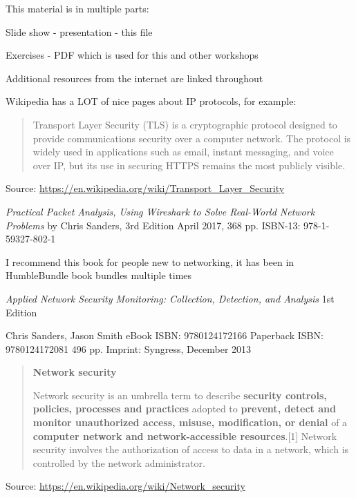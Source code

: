 \documentclass[Screen16to9,17pt]{foils}
\begin{document}

\begin{list2}
\item This material is in multiple parts:

\item Slide show - presentation - this file
\item Exercises - PDF which is used for this and other workshops
\item Additional resources from the internet are linked throughout
\item Wikipedia has a LOT of nice pages about IP protocols, for example:
\end{list2}

\begin{quote}\small
Transport Layer Security (TLS) is a cryptographic protocol designed to provide communications security over a computer network. The protocol is widely used in applications such as email, instant messaging, and voice over IP, but its use in securing HTTPS remains the most publicly visible.
\end{quote}
Source: \url{https://en.wikipedia.org/wiki/Transport_Layer_Security}




\emph{Practical Packet Analysis,
Using Wireshark to Solve Real-World Network Problems}
by Chris Sanders, 3rd Edition
April 2017, 368 pp.
ISBN-13:
978-1-59327-802-1

I recommend this book for people new to networking, it has been in HumbleBundle book bundles multiple times




\emph{Applied Network Security Monitoring: Collection, Detection, and Analysis}
1st Edition

Chris Sanders, Jason Smith
eBook ISBN: 9780124172166
Paperback ISBN: 9780124172081 496 pp.
Imprint: Syngress, December 2013

{\footnotesize{}}





\begin{quote}
\textbf{\large Network security}

Network security is an umbrella term to describe \textbf{security controls, policies, processes and practices} adopted to \textbf{prevent, detect and monitor unauthorized access, misuse, modification, or denial} of a \textbf{computer network and network-accessible resources}.[1] Network security involves the authorization of access to data in a network, which is controlled by the network administrator.

\end{quote}
Source: \url{https://en.wikipedia.org/wiki/Network_security}
\end{document}
